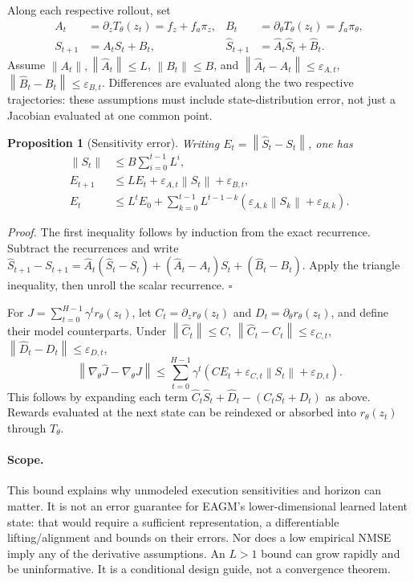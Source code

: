 \documentclass[10pt]{article}
\newtheorem{proposition}{Proposition}
\newenvironment{proof}{\par\noindent\textit{Proof.} }{\hfill$\square$\par}
\newcommand{\norm}[1]{\left\|#1\right\|}
\begin{document}
Along each respective rollout, set
\begin{align}
A_t&=\partial_z T_\theta(z_t)=f_z+f_a\pi_z,&
B_t&=\partial_\theta T_\theta(z_t)=f_a\pi_\theta,\\
S_{t+1}&=A_tS_t+B_t,&
\hat S_{t+1}&=\hat A_t\hat S_t+\hat B_t.
\end{align}
Assume $\norm{A_t},\norm{\hat A_t}\le L$, $\norm{B_t}\le B$, and
$\norm{\hat A_t-A_t}\le\varepsilon_{A,t}$,
$\norm{\hat B_t-B_t}\le\varepsilon_{B,t}$. Differences are evaluated along the two respective trajectories: these assumptions must include state-distribution error, not just a Jacobian evaluated at one common point.

\begin{proposition}[Sensitivity error]
Writing $E_t=\norm{\hat S_t-S_t}$, one has
\begin{align}
\norm{S_t}&\le B\sum_{i=0}^{t-1}L^i,\\
E_{t+1}&\le L E_t+\varepsilon_{A,t}\norm{S_t}+\varepsilon_{B,t},\\
E_t&\le L^tE_0+\sum_{k=0}^{t-1}L^{t-1-k}
(\varepsilon_{A,k}\norm{S_k}+\varepsilon_{B,k}).
\end{align}
\end{proposition}
\begin{proof}
The first inequality follows by induction from the exact recurrence. Subtract the recurrences and write
$\hat S_{t+1}-S_{t+1}=\hat A_t(\hat S_t-S_t)+(\hat A_t-A_t)S_t+(\hat B_t-B_t)$.
Apply the triangle inequality, then unroll the scalar recurrence.
\end{proof}
For $J=\sum_{t=0}^{H-1}\gamma^t r_\theta(z_t)$, let $C_t=\partial_z r_\theta(z_t)$ and $D_t=\partial_\theta r_\theta(z_t)$, and define their model counterparts. Under $\norm{\hat C_t}\le C$, $\norm{\hat C_t-C_t}\le\varepsilon_{C,t}$, $\norm{\hat D_t-D_t}\le\varepsilon_{D,t}$,
\begin{equation}
\norm{\nabla_\theta\hat J-\nabla_\theta J}
\le\sum_{t=0}^{H-1}\gamma^t
\left(C E_t+\varepsilon_{C,t}\norm{S_t}+\varepsilon_{D,t}\right).
\end{equation}
This follows by expanding each term $\hat C_t\hat S_t+\hat D_t-(C_tS_t+D_t)$ as above. Rewards evaluated at the next state can be reindexed or absorbed into $r_\theta(z_t)$ through $T_\theta$.

\paragraph{Scope.} This bound explains why unmodeled execution sensitivities and horizon can matter. It is not an error guarantee for EAGM's lower-dimensional learned latent state: that would require a sufficient representation, a differentiable lifting/alignment and bounds on their errors. Nor does a low empirical NMSE imply any of the derivative assumptions. An $L>1$ bound can grow rapidly and be uninformative. It is a conditional design guide, not a convergence theorem.
\end{document}
